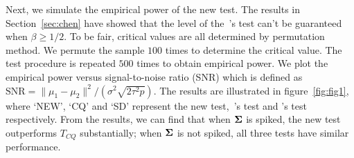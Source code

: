 \documentclass[review]{elsarticle}
\theoremstyle{plain}
\theoremstyle{definition}
\theoremstyle{remark}
\begin{document}
Next, we simulate the empirical power of the new test.
The results in Section~\ref{sec:chen} have showed that the level of the~\cite{Chen2010A}'s test can't be guaranteed when $\beta\geq 1/2$.
To be fair,  critical values are all determined by permutation method.
We permute the sample $100$ times to determine the critical value. The test procedure is repeated $500$ times to obtain empirical power.
We plot the empirical power versus signal-to-noise ratio (SNR) which is defined as $\textrm{SNR}=\|\mu_1-\mu_2\|^2/(\sigma^2\sqrt{2\tau^2 p})$.
The results are illustrated in figure~\ref{fig:fig1}, where `NEW', `CQ' and `SD' represent the new test,~\cite{Chen2010A}'s test and \cite{Srivastava2008A}'s test respectively.
From the results, we can find that when $\boldsymbol{\Sigma}$ is spiked, the new test outperforms $T_{CQ}$ substantially; when $\boldsymbol{\Sigma}$ is not spiked, all three tests have similar performance.
\end{document}

